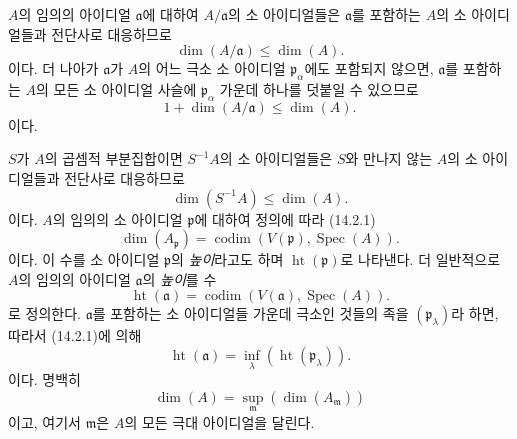 \begin{env}[16.1.2]
\label{0.16.1.2-fr}
$A$의 임의의 아이디얼 $\mathfrak{a}$에 대하여
$A/\mathfrak{a}$의 소 아이디얼들은 $\mathfrak{a}$를 포함하는
$A$의 소 아이디얼들과 전단사로 대응하므로
\[
\label{0.16.1.2.1-fr}
  \dim(A/\mathfrak{a})\leq\dim(A).
\tag{16.1.2.1}
\]
이다. 더 나아가 $\mathfrak{a}$가 $A$의 어느 극소 소 아이디얼
$\mathfrak{p}_\alpha$에도 포함되지 않으면, $\mathfrak{a}$를 포함하는
$A$의 모든 소 아이디얼 사슬에 $\mathfrak{p}_\alpha$ 가운데 하나를
덧붙일 수 있으므로
\[
\label{0.16.1.2.2-fr}
  1+\dim(A/\mathfrak{a})\leq\dim(A).
\tag{16.1.2.2}
\]
이다.
\end{env}

\begin{env}[16.1.3]
\label{0.16.1.3-fr}
$S$가 $A$의 곱셈적 부분집합이면 $S^{-1}A$의 소 아이디얼들은
$S$와 만나지 않는 $A$의 소 아이디얼들과 전단사로 대응하므로
\[
\label{0.16.1.3.1-fr}
  \dim(S^{-1}A)\leq\dim(A).
\tag{16.1.3.1}
\]
이다. $A$의 임의의 소 아이디얼 $\mathfrak{p}$에 대하여 정의에 따라
(14.2.1)
\[
\label{0.16.1.3.2-fr}
  \dim(A_{\mathfrak{p}})
  =\operatorname{codim}(V(\mathfrak{p}),\operatorname{Spec}(A)).
\tag{16.1.3.2}
\]
이다. 이 수를 소 아이디얼 $\mathfrak{p}$의 \emph{높이}라고도 하며
$\operatorname{ht}(\mathfrak{p})$로 나타낸다. 더 일반적으로 $A$의
임의의 아이디얼 $\mathfrak{a}$의 \emph{높이}를 수
\[
\label{0.16.1.3.3-fr}
  \operatorname{ht}(\mathfrak{a})
  =\operatorname{codim}(V(\mathfrak{a}),\operatorname{Spec}(A)).
\tag{16.1.3.3}
\]
로 정의한다. $\mathfrak{a}$를 포함하는 소 아이디얼들 가운데 극소인
것들의 족을 $(\mathfrak{p}_\lambda)$라 하면, 따라서 (14.2.1)에 의해
\[
\label{0.16.1.3.4-fr}
  \operatorname{ht}(\mathfrak{a})
  =\inf_\lambda(\operatorname{ht}(\mathfrak{p}_\lambda)).
\tag{16.1.3.4}
\]
이다. 명백히
\[
\label{0.16.1.3.5-fr}
  \dim(A)=\sup_{\mathfrak{m}}(\dim(A_{\mathfrak{m}}))
\tag{16.1.3.5}
\]
이고, 여기서 $\mathfrak{m}$은 $A$의 모든 극대 아이디얼을 달린다.
\end{env}

